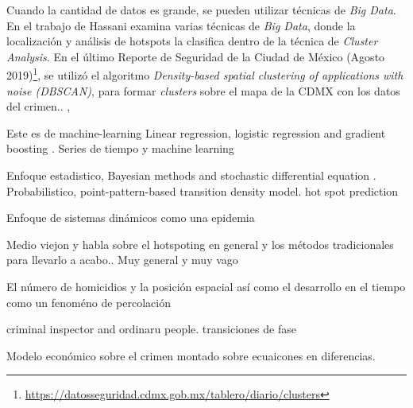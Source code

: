 \documentclass[onecolumn,12pt,letterpaper]{article}
\begin{document}
Cuando la cantidad de datos es grande, se pueden utilizar técnicas de \textit{Big Data}. En el trabajo de Hassani\cite{hassani_review_2016} examina varias técnicas de \textit{Big Data}, donde  la localización y análisis de hotspots la clasifica dentro de la técnica de \textit{Cluster Analysis}. En el último Reporte de Seguridad de la Ciudad de México (Agosto 2019)\footnote{\url{https://datosseguridad.cdmx.gob.mx/tablero/diario/clusters}}, se utilizó el algoritmo \textit{Density-based spatial clustering of applications with noise (DBSCAN)}, para formar \textit{clusters} sobre el mapa de la CDMX con los datos del crimen.\cite{noauthor_datos_nodate}.  \cite{noauthor_big_nodate} \cite{chen_crime_2004},


Este es de machine-learning \cite{alves_crime_2018}
Linear regression, logistic regression and gradient boosting \cite{ingilevich_crime_2018}. Series de tiempo y machine learning \cite{wang_learning_2013}


Enfoque estadistico\cite{noauthor_bayesian_nodate}, Bayesian methods and stochastic differential equation \cite{mohler_geographic_2012}. Probabilistico, point-pattern-based transition density model. hot spot prediction\cite{liu_criminal_2003} 

Enfoque de sistemas dinámicos como una epidemia \cite{gonzalez-parra_mathematical_2018} \cite{srivastav_modeling_2019} \cite{mcmillon_modeling_2014}


Medio viejon y habla sobre el hotspoting en general y los métodos tradicionales para llevarlo a acabo.\cite{bowers_prospective_2004}. Muy general y muy vago \cite{butorac_geography_2017}


El número de homicidios y la posición espacial así como el desarrollo en el tiempo como un fenoméno de percolación \cite{alves_spatial_2015} 

criminal inspector and ordinaru people. transiciones de fase \cite{perc_understanding_2013} 

Modelo económico sobre el crimen montado sobre ecuaicones en diferencias. \cite{freeman_spatial_1996}



\end{document}
